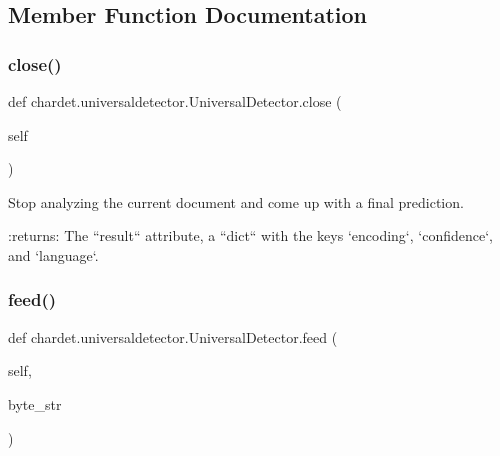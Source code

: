 \subsection{Member Function Documentation}
\mbox{\label{classchardet_1_1universaldetector_1_1_universal_detector_ad90ae39690b24a154988a1dfacee0bf8}} 
\subsubsection{\texorpdfstring{close()}{close()}}
{\footnotesize\ttfamily def chardet.\+universaldetector.\+Universal\+Detector.\+close (\begin{DoxyParamCaption}\item[{}]{self }\end{DoxyParamCaption})}

\begin{DoxyVerb}Stop analyzing the current document and come up with a final
prediction.

:returns:  The ``result`` attribute, a ``dict`` with the keys
   `encoding`, `confidence`, and `language`.
\end{DoxyVerb}
 \mbox{\label{classchardet_1_1universaldetector_1_1_universal_detector_a2d4e353e650db43bce8689fbb18464c5}} 
\subsubsection{\texorpdfstring{feed()}{feed()}}
{\footnotesize\ttfamily def chardet.\+universaldetector.\+Universal\+Detector.\+feed (\begin{DoxyParamCaption}\item[{}]{self,  }\item[{}]{byte\+\_\+str }\end{DoxyParamCaption})}

